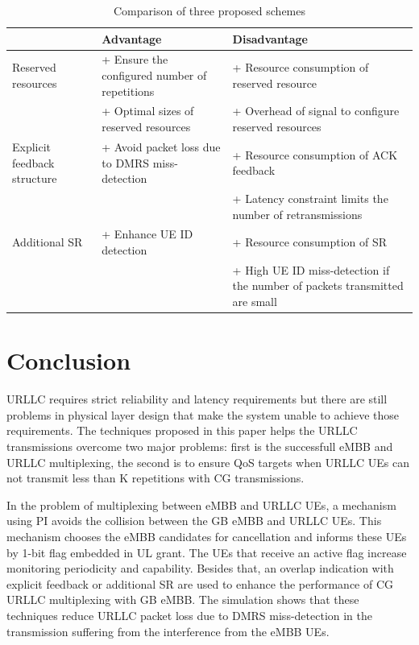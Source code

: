 \documentclass{ieeeaccess}
\begin{document}


\begin{table}[htbp]
\caption{Comparison of three proposed schemes}
\begin{center}
\begin{tabular}{|p{4em}|p{11em}|p{11em}|}
 \hline
& \textbf{Advantage}&\textbf{Disadvantage}\\
 \hline
 Reserved resources &+ Ensure the configured number of repetitions & + Resource consumption of reserved resource\\ & + Optimal sizes of reserved resources &+ Overhead of signal to configure reserved resources\\
 \hline
  Explicit feedback structure& + Avoid packet loss due to DMRS miss-detection&+ Resource consumption of ACK feedback\\& &+ Latency constraint limits the number of retransmissions\\
 \hline
Additional SR&+ Enhance UE ID detection&+ Resource consumption of SR\\& &  + High UE ID miss-detection if the number of packets transmitted are small\\

 
 \hline
\end{tabular}
\label{tab9}
\end{center}
\vspace{-6mm}
\end{table}






\section{Conclusion}

URLLC requires strict reliability and latency requirements but there are still problems in physical layer design that make the system unable to achieve those requirements. The techniques proposed in this paper helps the URLLC transmissions overcome two major problems: first is the successfull eMBB and URLLC multiplexing, the second is to ensure QoS targets when URLLC UEs can not transmit less than K repetitions with CG transmissions. 

In the problem of multiplexing between eMBB and URLLC UEs, a mechanism using PI avoids the collision between the GB eMBB and URLLC UEs. This mechanism chooses the eMBB candidates for cancellation and informs these UEs by 1-bit flag embedded in UL grant. The UEs that receive an active flag increase monitoring periodicity and capability. Besides that, an overlap indication with explicit feedback or additional SR are used to enhance the performance of CG URLLC multiplexing with GB eMBB. The simulation shows that these techniques reduce URLLC packet loss due to DMRS miss-detection in the transmission suffering from the interference from the eMBB UEs. 
\end{document}

